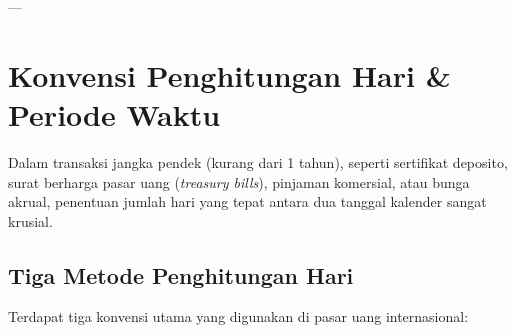 \documentclass[11pt,a4paper]{article}
\begin{document}
---

\section{Konvensi Penghitungan Hari \& Periode Waktu}

Dalam transaksi jangka pendek (kurang dari 1 tahun), seperti sertifikat deposito, surat berharga pasar uang (\textit{treasury bills}), pinjaman komersial, atau bunga akrual, penentuan jumlah hari yang tepat antara dua tanggal kalender sangat krusial.

\subsection{Tiga Metode Penghitungan Hari}

Terdapat tiga konvensi utama yang digunakan di pasar uang internasional:
\end{document}
